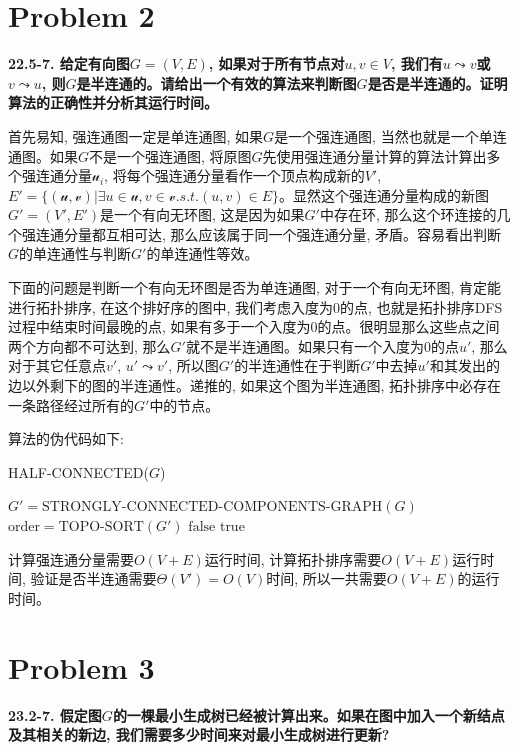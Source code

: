 \documentclass[paper=a4, fontsize=11pt]{scrartcl} %
\numberwithin{equation}{section} %
\numberwithin{figure}{section} %
\numberwithin{table}{section} %
\begin{document}
\section{Problem 2}
\textbf{22.5-7. 给定有向图$G = (V, E)$, 如果对于所有节点对$u, v \in V$, 我们有$u \leadsto v$或$v \leadsto u$, 则$G$是半连通的。请给出一个有效的算法来判断图$G$是否是半连通的。证明算法的正确性并分析其运行时间。}

首先易知, 强连通图一定是单连通图, 如果$G$是一个强连通图, 当然也就是一个单连通图。如果$G$不是一个强连通图, 将原图$G$先使用强连通分量计算的算法计算出多个强连通分量$\mathscr{u}_i$, 将每个强连通分量看作一个顶点构成新的$V'$, $E' = \{(\mathscr{u}, \mathscr{v}) | \exists u \in \mathscr{u}, v \in \mathscr{v}. s.t. (u, v) \in E\}$。显然这个强连通分量构成的新图$G' = (V', E')$是一个有向无环图,  这是因为如果$G'$中存在环, 那么这个环连接的几个强连通分量都互相可达, 那么应该属于同一个强连通分量, 矛盾。容易看出判断$G$的单连通性与判断$G'$的单连通性等效。

下面的问题是判断一个有向无环图是否为单连通图, 对于一个有向无环图, 肯定能进行拓扑排序, 在这个排好序的图中, 我们考虑入度为0的点, 也就是拓扑排序DFS过程中结束时间最晚的点, 如果有多于一个入度为0的点。很明显那么这些点之间两个方向都不可达到, 那么$G'$就不是半连通图。如果只有一个入度为0的点$u'$, 那么对于其它任意点$v'$, $u' \leadsto v'$, 所以图$G'$的半连通性在于判断$G'$中去掉$u'$和其发出的边以外剩下的图的半连通性。递推的, 如果这个图为半连通图, 拓扑排序中必存在一条路径经过所有的$G'$中的节点。

算法的伪代码如下:

\begin{algorithm}[H]
  \caption{HALF-CONNECTED($G$)}
  \label{algo:1}
  \begin{algorithmic}
    \State $G' = \mbox{STRONGLY-CONNECTED-COMPONENTS-GRAPH}(G)$ 
    \State $\mbox{order} = \mbox{TOPO-SORT}(G')$
    \State\Return $\mbox{false}$
    \EndIf
    \EndFor
    \State\Return $\mbox{true}$
  \end{algorithmic}
\end{algorithm}

计算强连通分量需要$O(V+E)$运行时间, 计算拓扑排序需要$O(V+E)$运行时间, 验证是否半连通需要$\Theta(V') = O(V)$时间, 所以一共需要$O(V+E)$的运行时间。

\section{Problem 3}
\textbf{23.2-7. 假定图$G$的一棵最小生成树已经被计算出来。如果在图中加入一个新结点及其相关的新边, 我们需要多少时间来对最小生成树进行更新?}
\end{document}
